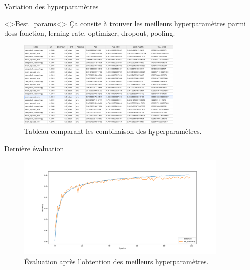 \documentclass[10pt,handout]{beamer}
\begin{document}
\begin{frame}{Variation des hyperparamètres}
    \begin{block}<>{Best\_params}<>
        Ça consite à trouver les meilleurs hyperparamètres parmi :loss fonction, lerning rate, optimizer, dropout, pooling.
    \end{block}
    \begin{figure}
        \centering
        \includegraphics[width=0.7\textwidth]{img/csv.png}
        \caption{Tableau comparant les combinaison des hyperparamètres.}
    \end{figure}
\end{frame}

\begin{frame}{Dernière évaluation}
    \begin{figure}
        \centering
        \includegraphics[width=0.9\textwidth]{img/model-final-acc.png}
        \caption{Évaluation après l'obtention des meilleurs hyperparamètres.}
    \end{figure}
\end{frame}
\end{document}
